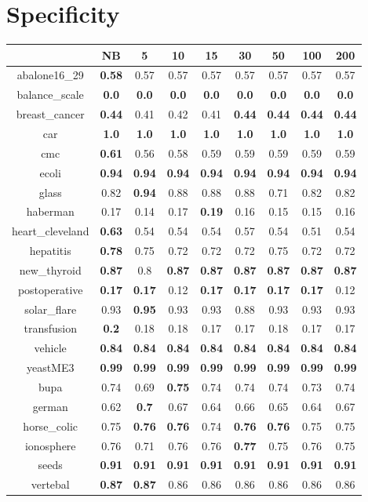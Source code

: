 \documentclass{article}%
\begin{document}
%
\section*{Specificity}%
\begin{tabular}{c|cccccccc}%
\hline%
&NB&5&10&15&30&50&100&200\\%
\hline%
abalone16\_29&\textbf{0.58}&0.57&0.57&0.57&0.57&0.57&0.57&0.57\\%
\hline%
balance\_scale&\textbf{0.0}&\textbf{0.0}&\textbf{0.0}&\textbf{0.0}&\textbf{0.0}&\textbf{0.0}&\textbf{0.0}&\textbf{0.0}\\%
\hline%
breast\_cancer&\textbf{0.44}&0.41&0.42&0.41&\textbf{0.44}&\textbf{0.44}&\textbf{0.44}&\textbf{0.44}\\%
\hline%
car&\textbf{1.0}&\textbf{1.0}&\textbf{1.0}&\textbf{1.0}&\textbf{1.0}&\textbf{1.0}&\textbf{1.0}&\textbf{1.0}\\%
\hline%
cmc&\textbf{0.61}&0.56&0.58&0.59&0.59&0.59&0.59&0.59\\%
\hline%
ecoli&\textbf{0.94}&\textbf{0.94}&\textbf{0.94}&\textbf{0.94}&\textbf{0.94}&\textbf{0.94}&\textbf{0.94}&\textbf{0.94}\\%
\hline%
glass&0.82&\textbf{0.94}&0.88&0.88&0.88&0.71&0.82&0.82\\%
\hline%
haberman&0.17&0.14&0.17&\textbf{0.19}&0.16&0.15&0.15&0.16\\%
\hline%
heart\_cleveland&\textbf{0.63}&0.54&0.54&0.54&0.57&0.54&0.51&0.54\\%
\hline%
hepatitis&\textbf{0.78}&0.75&0.72&0.72&0.72&0.75&0.72&0.72\\%
\hline%
new\_thyroid&\textbf{0.87}&0.8&\textbf{0.87}&\textbf{0.87}&\textbf{0.87}&\textbf{0.87}&\textbf{0.87}&\textbf{0.87}\\%
\hline%
postoperative&\textbf{0.17}&\textbf{0.17}&0.12&\textbf{0.17}&\textbf{0.17}&\textbf{0.17}&\textbf{0.17}&0.12\\%
\hline%
solar\_flare&0.93&\textbf{0.95}&0.93&0.93&0.88&0.93&0.93&0.93\\%
\hline%
transfusion&\textbf{0.2}&0.18&0.18&0.17&0.17&0.18&0.17&0.17\\%
\hline%
vehicle&\textbf{0.84}&\textbf{0.84}&\textbf{0.84}&\textbf{0.84}&\textbf{0.84}&\textbf{0.84}&\textbf{0.84}&\textbf{0.84}\\%
\hline%
yeastME3&\textbf{0.99}&\textbf{0.99}&\textbf{0.99}&\textbf{0.99}&\textbf{0.99}&\textbf{0.99}&\textbf{0.99}&\textbf{0.99}\\%
\hline%
bupa&0.74&0.69&\textbf{0.75}&0.74&0.74&0.74&0.73&0.74\\%
\hline%
german&0.62&\textbf{0.7}&0.67&0.64&0.66&0.65&0.64&0.67\\%
\hline%
horse\_colic&0.75&\textbf{0.76}&\textbf{0.76}&0.74&\textbf{0.76}&\textbf{0.76}&0.75&0.75\\%
\hline%
ionosphere&0.76&0.71&0.76&0.76&\textbf{0.77}&0.75&0.76&0.75\\%
\hline%
seeds&\textbf{0.91}&\textbf{0.91}&\textbf{0.91}&\textbf{0.91}&\textbf{0.91}&\textbf{0.91}&\textbf{0.91}&\textbf{0.91}\\%
\hline%
vertebal&\textbf{0.87}&\textbf{0.87}&0.86&0.86&0.86&0.86&0.86&0.86\\%
\hline%
\end{tabular}
\end{document}
